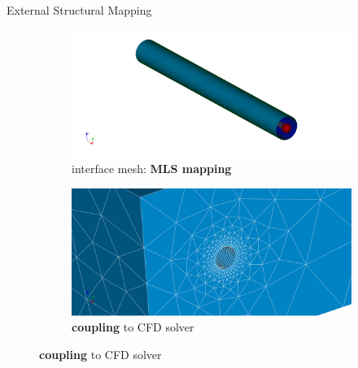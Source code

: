 \documentclass[10pt,t]{beamer}
\begin{document}
\begin{frame}{External Structural Mapping}
\begin{figure}
  \begin{subfigure}[t]{.486\textwidth}
    \centering
    \includegraphics[width=\linewidth]{images/mesh_1b.png}
    \caption{interface mesh: \textbf{MLS mapping}}
  \end{subfigure}
  \hfill
  \begin{subfigure}[t]{.486\textwidth}
    \centering
    \includegraphics[width=\linewidth]{images/whole_1aa.png}
    \caption{\textbf{coupling} to CFD solver}
  \end{subfigure}
\end{figure}


\end{frame}
\end{document}
